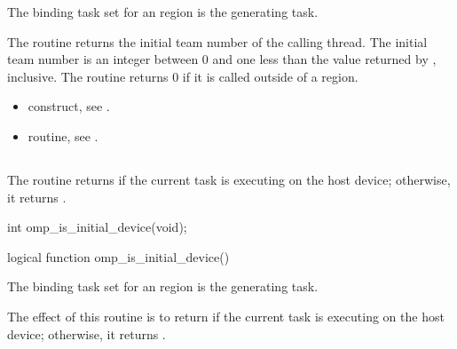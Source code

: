 \binding
The binding task set for an  region is the generating task.

\effect
The  routine returns the initial team number of the calling thread. The 
initial team number is an integer between 0 and one less than the value returned by 
, inclusive. The routine returns 0 if it is called outside of a 
 region.

\crossreferences
\begin{itemize}
\item {} construct, see 
.

\item {} routine, see 
. 
\end{itemize}









\subsection{}
\label{subsec:omp_is_initial_device}
\summary
The  routine returns  if the current task is executing 
on the host device; otherwise, it returns .

\begin{samepage}
\format
\begin{ccppspecific}
\begin{boxedcode}
int omp\_is\_initial\_device(void);
\end{boxedcode}
\end{ccppspecific}
\end{samepage}

\begin{fortranspecific}
\begin{boxedcode}
logical function omp\_is\_initial\_device()
\end{boxedcode}
\end{fortranspecific}

\binding
The binding task set for an  region is the generating task.

\effect
The effect of this routine is to return  if the current task is executing on the host 
device; otherwise, it returns .


